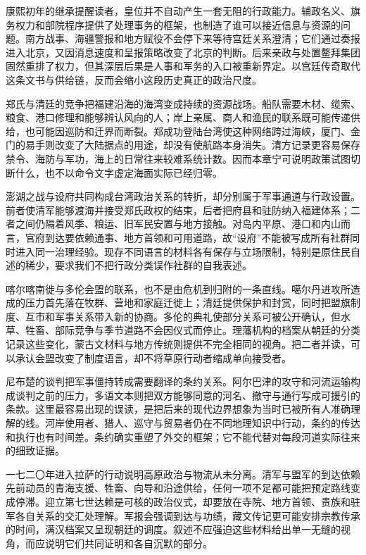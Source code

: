 康熙初年的继承提醒读者，皇位并不自动产生一套无阻的行政能力。辅政名义、旗务权力和部院程序提供了处理事务的框架，也制造了谁可以接近信息与资源的问题。南方战事、海疆警报和地方赋役不会停下来等待宫廷关系澄清；它们通过奏报进入北京，又因消息速度和呈报策略改变了北京的判断。后来亲政与处置鳌拜集团固然重排了权力，但其深层后果是人事和军务的入口被重新界定。以宫廷传奇取代这条文书与供给链，反而会缩小这段历史真正的政治尺度。

郑氏与清廷的竞争把福建沿海的海湾变成持续的资源战场。船队需要木材、缆索、粮食、港口修理和能够辨认风向的人；岸上亲属、商人和渔民的联系既可能传递供给，也可能因巡防和迁界而断裂。郑成功登陆台湾使这种网络跨过海峡，厦门、金门的易手则改变了大陆据点的用途，却没有使航路本身消失。清方记录更容易保存禁令、海防与军功，海上的日常往来较难系统计数。因而本章宁可说明政策试图切断什么，也不以命令文字虚定海面实际已经归零。

澎湖之战与设府共同构成台湾政治关系的转折，却分别属于军事通道与行政设置。前者使清军能够渡海并接受郑氏政权的结束，后者把府县和驻防纳入福建体系；二者之间仍隔着风季、粮运、旧军民安置与地方接触。对岛内平原、港口和内山而言，官府到达要依赖通事、地方首领和可用道路，故“设府”不能被写成所有社群同时进入同一治理经验。现存不同语言的材料各有保存与立场限制，特别是原住民自述的稀少，要求我们不把行政分类误作社群的自我表述。

喀尔喀南徙与多伦会盟的联系，也不是由危机到归附的一条直线。噶尔丹进攻所造成的压力首先落在牧群、营地和家庭迁徙上；清廷提供保护和封赏，同时把盟旗制度、互市和军事关系带入新的协商。多伦的典礼使部分关系可被公开确认，但水草、牲畜、部际竞争与季节道路不会因仪式而停止。理藩机构的档案从朝廷的分类记录这些变化，蒙古文材料与地方传统则提供不完全相同的视角。把二者并读，可以承认会盟改变了制度语言，却不将草原行动者缩成单向接受者。

尼布楚的谈判把军事僵持转成需要翻译的条约关系。阿尔巴津的攻守和河流运输构成谈判之前的压力，多语文本则把双方能够同意的河名、撤守与通行写成可援引的条款。这里最容易出现的误读，是把后来的现代边界想象为当时已被所有人准确理解的线。河岸使用者、猎人、巡守与贸易者仍在不同地理知识中行动，条约的传达和执行也有时间差。条约确实重塑了外交的框架；它不能代替对每段河道实际往来的细致证据。

一七二〇年进入拉萨的行动说明高原政治与物流从未分离。清军与盟军的到达依赖先前动员的青海支援、牲畜、向导和沿途供给，任何一项不足都可能把预定路线变成停滞。迎立第七世达赖是可核的政治仪式，却要放在寺院、地方首领、贵族和驻军各自关系的交汇处理解。军报会强调到达与功绩，藏文传记更可能安排宗教传承的时间，满汉档案又呈现朝廷的调度。叙述不应强迫这些材料给出单一无缝的视角，而应说明它们共同证明和各自沉默的部分。

